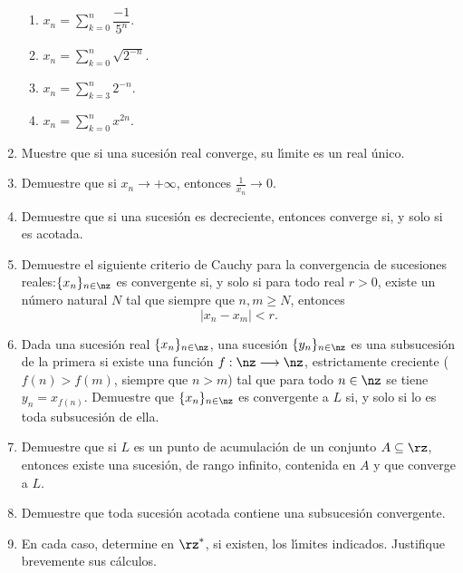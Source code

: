 \begin{enumerate}
\begin{enumerate}
\item $x_{n}=\sum\limits_{k=0}^{n}\dfrac{-1}{5^{n}}$.

\item $x_{n}=\sum\limits_{k=0}^{n}\sqrt{2^{-n}}$.

\item $x_{n}=\sum\limits_{k=3}^{n}2^{-n}$.

\item $x_{n}=\sum\limits_{k=0}^{n}x^{2n}$.
\end{enumerate}

\item Muestre que si una sucesi\'{o}n real converge, su l\'{\i}mite es un real \'{u}nico.

\item Demuestre que si $x_{n}\rightarrow+\infty$, entonces $\frac{1}{x_{n}%
}\rightarrow0$.

\item Demuestre que si una sucesi\'{o}n es decreciente, entonces converge si,
y solo si es acotada.

\item Demuestre el siguiente criterio de
%
Cauchy para la convergencia de
%
sucesiones reales:\newline$\{x_{n}\}_{n\in\nz}$ es convergente si, y solo si
para todo real $r>0$, existe un n\'{u}mero natural $N$ tal que siempre que
$n,m\geq N$, entonces
\[
|x_{n}-x_{m}|<r.
\]


\item Dada una sucesi\'{o}n real $\{x_{n}\}_{n\in\nz}$, una sucesi\'{o}n
$\{y_{n}\}_{n\in\nz}$ es una subsucesi\'{o}n
%
de la primera si existe una funci\'{o}n $f:\nz\longrightarrow\nz$,
estrictamente creciente ($f(n)>f(m)$, siempre que $n>m$) tal que para todo
$n\in\nz$ se tiene $y_{n}=x_{f(n)}$. Demuestre que $\{x_{n}\}_{n\in\nz}$ es
convergente a $L$ si, y solo si lo es toda subsucesi\'{o}n de ella.

\item Demuestre que si $L$ es un punto de acumulaci\'{o}n de un conjunto
$A\subseteq\rz$, entonces existe una sucesi\'{o}n, de rango infinito,
contenida en $A$ y que converge a $L$.

\item Demuestre que toda sucesi\'{o}n acotada contiene una subsucesi\'{o}n convergente.

\item En cada caso, determine en $\rz^{\ast}$, si existen, los l\'{\i}mites
indicados. Justifique brevemente sus c\'{a}lculos.


\end{enumerate}
